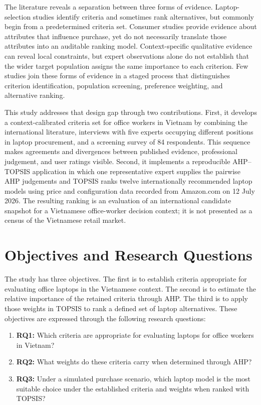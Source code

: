 The literature reveals a separation between three forms of evidence. Laptop-selection studies
identify criteria and sometimes rank alternatives, but commonly begin from a predetermined
criteria set. Consumer studies provide evidence about attributes that influence purchase, yet do
not necessarily translate those attributes into an auditable ranking model. Context-specific
qualitative evidence can reveal local constraints, but expert observations alone do not establish
that the wider target population assigns the same importance to each criterion. Few studies join
these forms of evidence in a staged process that distinguishes criterion identification,
population screening, preference weighting, and alternative ranking.

This study addresses that design gap through two contributions. First, it develops a
context-calibrated criteria set for office workers in Vietnam by combining the international
literature, interviews with five experts occupying different positions in laptop procurement, and
a screening survey of 84 respondents. This sequence makes agreements and divergences between
published evidence, professional judgement, and user ratings visible. Second, it implements a
reproducible AHP--TOPSIS application in which one representative expert supplies the pairwise AHP
judgements and TOPSIS ranks twelve internationally recommended laptop models using price and
configuration data recorded from Amazon.com on 12 July 2026. The resulting ranking is an
evaluation of an international candidate snapshot for a Vietnamese office-worker decision
context; it is not presented as a census of the Vietnamese retail market.

\section{Objectives and Research Questions}\label{sec:objectives}

The study has three objectives. The first is to establish criteria appropriate for evaluating
office laptops in the Vietnamese context. The second is to estimate the relative importance of
the retained criteria through AHP. The third is to apply those weights in TOPSIS to rank a defined
set of laptop alternatives. These objectives are expressed through the following research
questions:

\begin{enumerate}
  \item \textbf{RQ1:} Which criteria are appropriate for evaluating laptops for office workers in Vietnam?
  \item \textbf{RQ2:} What weights do these criteria carry when determined through AHP?
  \item \textbf{RQ3:} Under a simulated purchase scenario, which laptop model is the most suitable choice under the established criteria and weights when ranked with TOPSIS?
\end{enumerate}

